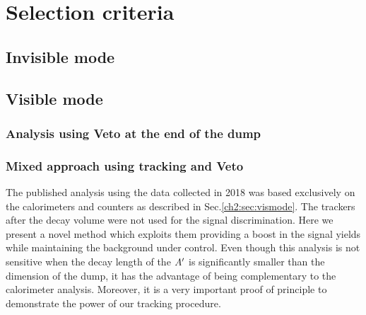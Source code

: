 \section{Selection criteria}
\label{ch3:sec:selection-criteria}

\subsection{Invisible mode}
\label{ch3:sec:selection-criteria-invis}

\subsection{Visible mode}
\label{ch3:sec:selection-criteria-vis}

\subsubsection{Analysis using Veto at the end of the dump}
\label{ch3:sec:vis-mode-veto}

\subsubsection{Mixed approach using tracking and Veto}
\label{ch3:sec:vis-mode-tracking}


The published analysis using the data collected in 2018 \cite{Banerjee:2019hmi} was based exclusively on the calorimeters and counters as described in Sec.\ref{ch2:sec:vismode}. The trackers after the decay volume were not used for the signal discrimination. Here we present a novel method which exploits them providing a boost in the signal yields while maintaining the background under control. Even though this analysis is not sensitive when the decay length of the $A'$ is significantly smaller than the dimension of the dump, it has the advantage of being complementary to the calorimeter analysis. Moreover, it is a very important proof of principle to demonstrate the power of our tracking procedure.

